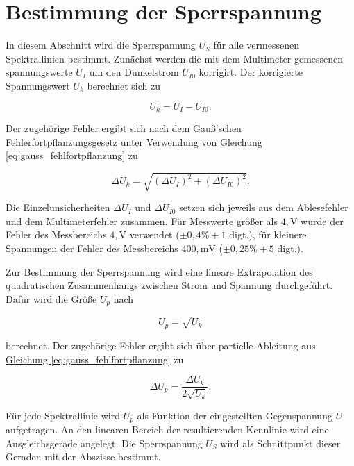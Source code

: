 \twocolumn

\section{Bestimmung der Sperrspannung}
\label{sec:sperrspannung}

In diesem Abschnitt wird die Sperrspannung $U_S$ für alle vermessenen Spektrallinien bestimmt.
Zunächst werden die mit dem Multimeter gemessenen spannungswerte $U_I$ um den Dunkelstrom $U_{I0}$ korrigirt. Der korrigierte Spannungswert $U_k$ berechnet sich zu

\begin{equation}
\label{eq:uk}
U_k = U_I - U_{I0}.
\end{equation}

Der zugehörige Fehler ergibt sich nach dem Gauß'schen Fehlerfortpflanzungsgesetz unter Verwendung von \hyperref[eq:gauss_fehlfortpflanzung]{Gleichung \ref*{eq:gauss_fehlfortpflanzung}} zu

\begin{equation}
\label{eq:duk}
\Delta U_k = \sqrt{(\Delta U_I)^2 + (\Delta U_{I0})^2}.
\end{equation}

Die Einzelunsicherheiten $\Delta U_I$ und $\Delta U_{I0}$ setzen sich jeweils aus dem Ablesefehler und dem Multimeterfehler zusammen.
Für Messwerte größer als $4,\text{V}$ wurde der Fehler des Messbereichs $4,\text{V}$ verwendet ($\pm 0,4\% + 1$ digt.), für kleinere Spannungen der Fehler des Messbereichs $400,\text{mV}$ ($\pm 0,25\% + 5$ digt.).

Zur Bestimmung der Sperrspannung wird eine lineare Extrapolation des quadratischen Zusammenhangs zwischen Strom und Spannung durchgeführt. Dafür wird die Größe $U_p$ nach

\begin{equation}
\label{eq:up}
U_p = \sqrt{U_k}
\end{equation}

berechnet. Der zugehörige Fehler ergibt sich über partielle Ableitung aus \hyperref[eq:gauss_fehlfortpflanzung]{Gleichung \ref*{eq:gauss_fehlfortpflanzung}} zu

\begin{equation}
\label{eq:dup}
\Delta U_p = \frac{\Delta U_k}{2 \sqrt{U_k}}.
\end{equation}

Für jede Spektrallinie wird $U_p$ als Funktion der eingestellten Gegenspannung $U$ aufgetragen.
An den linearen Bereich der resultierenden Kennlinie wird eine Ausgleichsgerade angelegt. Die Sperrspannung $U_S$ wird als Schnittpunkt dieser Geraden mit der Abszisse bestimmt.

